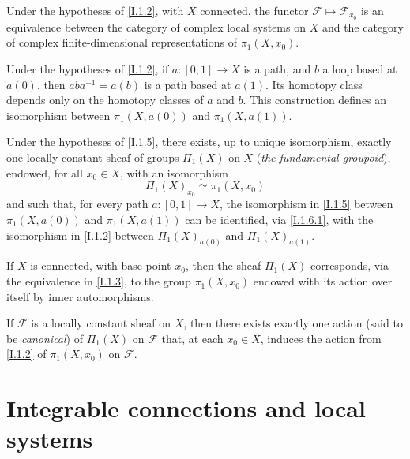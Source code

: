 \documentclass{report}
\theoremstyle{plain}
\newenvironment{proposition}[1]
    {\renewcommand\theinnercustomproposition{#1}\innercustomproposition}
    {\endinnercustomproposition}
\newenvironment{corollary}[1]
    {\renewcommand\theinnercustomcorollary{#1}\innercustomcorollary}
    {\endinnercustomcorollary}
\theoremstyle{definition}
\newenvironment{env}[1]
    {\renewcommand\theinnercustomenv{#1}\innercustomenv}
    {\endinnercustomenv}
\newcommand{\sh}{\mathscr}
\newcommand{\oldpage}[1]{\marginpar{\footnotesize$\Big\vert$ \textit{p.~#1}}}
\begin{document}
\oldpage{4}
\begin{corollary}{1.4}
\label{I.1.4}
  Under the hypotheses of \cref{I.1.2}, with $X$ connected, the functor $\sh{F}\mapsto\sh{F}_{x_0}$ is an equivalence between the category of complex local systems on $X$ and the category of complex finite-dimensional representations of $\pi_1(X,x_0)$.
\end{corollary}

\begin{env}{1.5}
\label{I.1.5}
  Under the hypotheses of \cref{I.1.2}, if $a\colon[0,1]\to X$ is a path, and $b$ a loop based at $a(0)$, then $aba^{-1}=a(b)$ is a path based at $a(1)$.
  Its homotopy class depends only on the homotopy classes of $a$ and $b$.
  This construction defines an isomorphism between $\pi_1(X,a(0))$ and $\pi_1(X,a(1))$.
\end{env}

\begin{proposition}{1.6}
\label{I.1.6}
  Under the hypotheses of \cref{I.1.5}, there exists, up to unique isomorphism, exactly one locally constant sheaf of groups $\Pi_1(X)$ on $X$ (\emph{the fundamental groupoid}), endowed, for all $x_0\in X$, with an isomorphism
  \[
  \label{I.1.6.1}
    \Pi_1(X)_{x_0} \simeq \pi_1(X,x_0)
  \tag{1.6.1}
  \]
  and such that, for every path $a\colon[0,1]\to X$, the isomorphism in \cref{I.1.5} between $\pi_1(X,a(0))$ and $\pi_1(X,a(1))$ can be identified, via \cref{I.1.6.1}, with the isomorphism in \cref{I.1.2} between $\Pi_1(X)_{a(0)}$ and $\Pi_1(X)_{a(1)}$.
\end{proposition}

If $X$ is connected, with base point $x_0$, then the sheaf $\Pi_1(X)$ corresponds, via the equivalence in \cref{I.1.3}, to the group $\pi_1(X,x_0)$ endowed with its action over itself by inner automorphisms.

\begin{proposition}{1.7}
\label{I.1.7}
  If $\sh{F}$ is a locally constant sheaf on $X$, then there exists exactly one action (said to be \emph{canonical}) of $\Pi_1(X)$ on $\sh{F}$ that, at each $x_0\in X$, induces the action from \cref{I.1.2} of $\pi_1(X,x_0)$ on $\sh{F}$.
\end{proposition}


\section{Integrable connections and local systems}
\label{I.2}

\oldpage{5}
\end{document}
